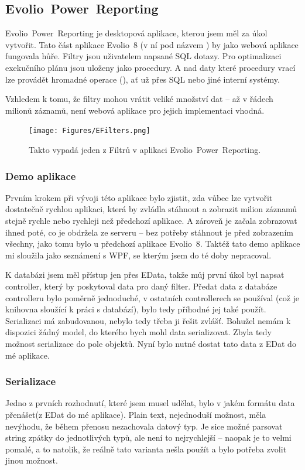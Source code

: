 \documentclass[czech,bachelor,dept460,male,csharp]{diploma}
\newcommand{\EvolioEight}{Evolio~8}
\newcommand{\EFilters}{Evolio~Power~Reporting}
\newcommand{\EData}{EData}
\begin{document}
	\subsection{\EFilters}
		{\EFilters} je desktopová aplikace, kterou jsem měl za úkol vytvořit. Tato část aplikace {\EvolioEight} (v ní pod názvem ) by jako webová aplikace fungovala hůře.
		Filtry jsou uživatelem napsané SQL dotazy. Pro optimalizaci exekučního plánu jsou uloženy jako procedury. A nad daty které procedury vrací lze provádět hromadné operace (), ať už přes SQL nebo jiné interní systémy.
		
		Vzhledem k tomu, že filtry mohou vrátit veliké množství dat – až v řádech milionů záznamů, není webová aplikace pro jejich implementaci vhodná.
			
			\begin{figure}[h!]
				\texttt{[image: Figures/EFilters.png]}
				\caption{Takto vypadá jeden z Filtrů v aplikaci {\EFilters}.}
    			\label{fig:EFilters}
			\end{figure}
		
		\subsubsection{Demo aplikace}
			Prvním krokem při vývoji této aplikace bylo zjistit, zda vůbec lze vytvořit dostatečně rychlou aplikaci, která by zvládla stáhnout a zobrazit milion záznamů stejně rychle nebo rychleji než předchozí aplikace. A zároveň je začala zobrazovat ihned poté, co je obdržela ze serveru – bez potřeby stáhnout je před zobrazením všechny, jako tomu bylo u předchozí aplikace {\EvolioEight}.
			Taktéž tato demo aplikace mi sloužila jako seznámení s WPF, se kterým jsem do té doby nepracoval.
			
			K databázi jsem měl přístup jen přes {\EData}, takže můj první úkol byl napsat controller, který by poskytoval data pro daný filter. Předat data z databáze controlleru bylo poměrně jednoduché, v ostatních controllerech se používal  (což je knihovna sloužící k práci s databází), bylo tedy příhodné jej také použít. Serializaci má zabudovanou, nebylo tedy třeba ji řešit zvlášť. Bohužel nemám k dispozici žádný model, do kterého bych mohl data serializovat. Zbyla tedy možnost serializace do pole objektů. Nyní bylo nutné dostat tato data z EDat do mé aplikace.
		\subsubsection{Serializace}
			Jedno z prvních rozhodnutí, které jsem musel udělat, bylo v jakém formátu data přenášet(z EDat do mé aplikace). Plain text, nejednoduší možnost, měla nevýhodu, že během přenosu nezachovala datový typ. Je sice možné parsovat string zpátky do jednotlivých typů, ale není to nejrychlejší -- naopak je to velmi pomalé, a to natolik, že reálně tato varianta nešla použít a bylo potřeba zvolit jinou možnost.
			
\end{document}
